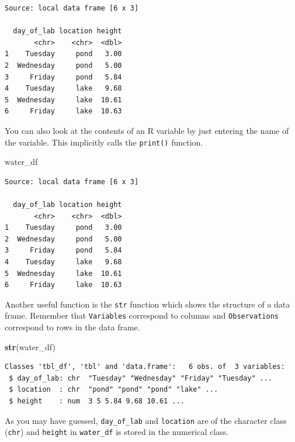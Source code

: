 \documentclass[twoside, 12pt]{article}
\newenvironment{Shaded}{\begin{snugshade}}{\end{snugshade}}
\newcommand{\KeywordTok}[1]{\textcolor[rgb]{0.13,0.29,0.53}{\textbf{{#1}}}}
\newcommand{\NormalTok}[1]{{#1}}
\begin{document}
\begin{Verbatim}[frame=single]
Source: local data frame [6 x 3]

  day_of_lab location height
       <chr>    <chr>  <dbl>
1    Tuesday     pond   3.00
2  Wednesday     pond   5.00
3     Friday     pond   5.84
4    Tuesday     lake   9.68
5  Wednesday     lake  10.61
6     Friday     lake  10.63
\end{Verbatim}

You can also look at the contents of an R variable by just entering the
name of the variable. This implicitly calls the \texttt{print()}
function.

\begin{Shaded}
\begin{Highlighting}[]
\NormalTok{water_df}
\end{Highlighting}
\end{Shaded}

\begin{Verbatim}[frame=single]
Source: local data frame [6 x 3]

  day_of_lab location height
       <chr>    <chr>  <dbl>
1    Tuesday     pond   3.00
2  Wednesday     pond   5.00
3     Friday     pond   5.84
4    Tuesday     lake   9.68
5  Wednesday     lake  10.61
6     Friday     lake  10.63
\end{Verbatim}

Another useful function is the \texttt{str} function which shows the
structure of a data frame. Remember that \texttt{Variables} correspond
to columns and \texttt{Observations} correspond to rows in the data
frame.

\begin{Shaded}
\begin{Highlighting}[]
\KeywordTok{str}\NormalTok{(water_df)}
\end{Highlighting}
\end{Shaded}

\begin{Verbatim}[frame=single]
Classes 'tbl_df', 'tbl' and 'data.frame':   6 obs. of  3 variables:
 $ day_of_lab: chr  "Tuesday" "Wednesday" "Friday" "Tuesday" ...
 $ location  : chr  "pond" "pond" "pond" "lake" ...
 $ height    : num  3 5 5.84 9.68 10.61 ...
\end{Verbatim}

As you may have guessed, \texttt{day\_of\_lab} and \texttt{location} are
of the character class (\texttt{chr}) and \texttt{height} in
\texttt{water\_df} is stored in the numerical class.
\end{document}
